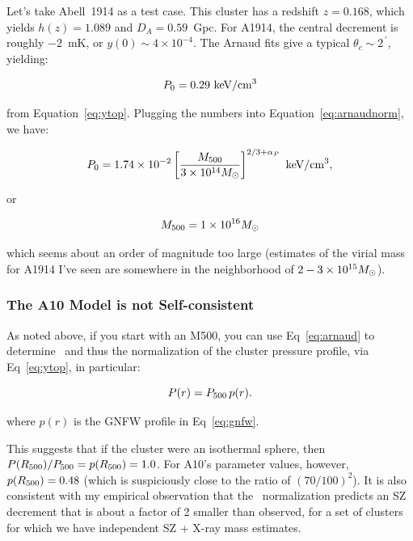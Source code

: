 Let's take Abell~1914 as a test case.  This cluster has a redshift $z
= 0.168$, which yields $h(z) = 1.089$ and $D_A = 0.59$~Gpc.  For A1914, the central
decrement is roughly $-2$~mK, or $y(0) \sim 4\times 10^{-4}$.  The Arnaud fits
give a typical $\theta_c\sim 2^{\,\prime}$, yielding:

\begin{equation}
P_0 = 0.29~{\rm keV/cm^3}
\end{equation}

from Equation~\ref{eq:ytop}.  Plugging the numbers into Equation~\ref{eq:arnaudnorm}, we have:

\begin{equation}
P_0 = 1.74\times 10^{-2}\left[{\M500\over{3\times10^{14}\Msolar}}\right]^{2/3+\alpha_P}~{\rm keV/cm^3},
\end{equation}

or

\begin{equation}
\M500 = 1\times10^{16}\Msolar
\end{equation}

which seems about an order of magnitude too large (estimates of the virial mass for A1914 I've seen are somewhere in the neighborhood of $2-3\times10^{15}M_{\odot}$).

\subsubsection{The A10 Model is not Self-consistent}

As noted above, if you start with an M500, you can use
Eq~\ref{eq:arnaud} to determine \ and thus the normalization of
the cluster pressure profile, via Eq~\ref{eq:ytop}, in particular:

\begin{equation}\nonumber
P(r) = \P500\,p(r).
\end{equation}

where $p(r)$ is the GNFW profile in Eq~\ref{eq:gnfw}.  

This suggests that if the cluster were an isothermal sphere, then
$P(\R500)/\P500 = p(\R500) = 1.0$.  For A10's parameter values,
however, $p(\R500) = 0.48$ (which is suspiciously close to the ratio
of $(70/100)^2$).  It is also consistent with my empirical observation
that the \ normalization predicts an SZ decrement that is
about a factor of 2 smaller than observed, for a set of clusters for
which we have independent SZ + X-ray mass estimates.

